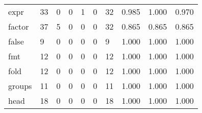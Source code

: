 \begin{longtable}{lp{1.3cm}p{1.3cm}p{1.3cm}p{1.3cm}p{1.3cm}p{1.3cm}p{1.3cm}p{1.3cm}p{1.3cm}}
expr      &                     33 &                                             0 &                                            0 &                                           1 &                                            0 &                                         32 &                                0.985 &                                  1.000 &                                0.970 \\
factor    &                     37 &                                             5 &                                            0 &                                           0 &                                            0 &                                         32 &                                0.865 &                                  0.865 &                                0.865 \\
false     &                      9 &                                             0 &                                            0 &                                           0 &                                            0 &                                          9 &                                1.000 &                                  1.000 &                                1.000 \\
fmt       &                     12 &                                             0 &                                            0 &                                           0 &                                            0 &                                         12 &                                1.000 &                                  1.000 &                                1.000 \\
fold      &                     12 &                                             0 &                                            0 &                                           0 &                                            0 &                                         12 &                                1.000 &                                  1.000 &                                1.000 \\
groups    &                     11 &                                             0 &                                            0 &                                           0 &                                            0 &                                         11 &                                1.000 &                                  1.000 &                                1.000 \\
head      &                     18 &                                             0 &                                            0 &                                           0 &                                            0 &                                         18 &                                1.000 &                                  1.000 &                                1.000 \\

\end{longtable}
